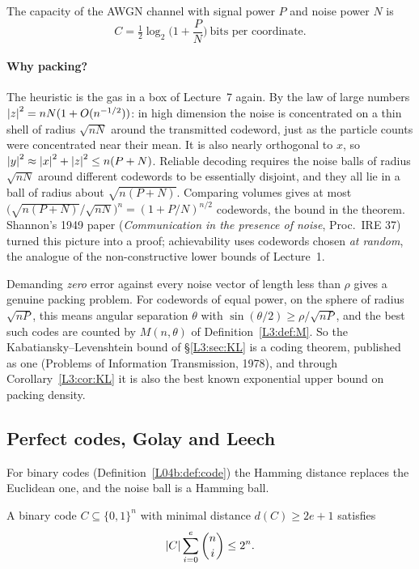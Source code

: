 \begin{theorem}[Shannon 1948, 1949]\label{SM:thm:awgn}
The capacity of the AWGN channel with signal power $P$ and noise power $N$ is
\[
  C=\tfrac12\log_2\Big(1+\frac PN\Big)\ \text{bits per coordinate}.
\]
\end{theorem}


\paragraph{Why packing?} The heuristic is the gas in a box of Lecture~7 again. By the law of large
numbers $\left\lvert z \right\rvert^2=nN(1+O(n^{-1/2}))$: in high dimension the noise is concentrated on a thin shell of
radius $\sqrt{nN}$ around the transmitted codeword, just as the particle counts were concentrated near
their mean. It is also nearly orthogonal to $x$, so $\left\lvert y \right\rvert^2\approx\left\lvert x \right\rvert^2+\left\lvert z \right\rvert^2\le n(P+N)$. Reliable
decoding requires the noise balls of radius $\sqrt{nN}$ around different codewords to be essentially
disjoint, and they all lie in a ball of radius about $\sqrt{n(P+N)}$. Comparing volumes gives at most
$\big(\sqrt{n(P+N)}/\sqrt{nN}\big)^n=(1+P/N)^{n/2}$ codewords, the bound in the theorem. Shannon's 1949 paper (\emph{Communication in the presence of noise}, Proc.\
IRE 37) turned this picture into a proof; achievability uses codewords chosen \emph{at random}, the
analogue of the non-constructive lower bounds of Lecture~1.

Demanding \emph{zero} error against every noise vector of length less than $\rho$ gives a genuine packing
problem. For codewords of equal power, on the sphere of radius $\sqrt{nP}$, this means angular separation
$\theta$ with $\sin(\theta/2)\ge\rho/\sqrt{nP}$, and the best such codes are counted by $M(n,\theta)$ of
Definition~\ref{L3:def:M}. So the Kabatiansky--Levenshtein bound of \S\ref{L3:sec:KL} is a coding theorem,
published as one (Problems of Information Transmission, 1978), and through Corollary~\ref{L3:cor:KL} it is
also the best known exponential upper bound on packing density.

\subsection{Perfect codes, Golay and Leech}

For binary codes (Definition~\ref{L04b:def:code}) the Hamming distance replaces the Euclidean one, and the
noise ball is a Hamming ball.

\begin{proposition}\label{SM:prop:hamming}
A binary code $C\subseteq\{0,1\}^n$ with minimal distance $d(C)\ge2e+1$ satisfies
\[
  \left\lvert C \right\rvert\sum_{i=0}^e\binom ni\le2^n .
\]
\end{proposition}

